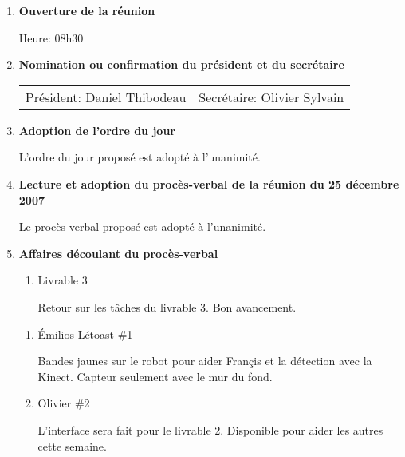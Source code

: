 \documentclass[12pt]{ULojpv}
\begin{document}
\entete
\begin{enumerate}
\item \textbf{Ouverture de la réunion}

Heure: 08h30


\item \textbf{Nomination ou confirmation du président et du secrétaire}

\begin{tabular}{@{}ll}
   Président: Daniel Thibodeau
   & Secrétaire: Olivier Sylvain
\end{tabular}


\item \textbf{Adoption de l'ordre du jour}

L'ordre du jour proposé est adopté à l'unanimité.


\item \textbf{Lecture et adoption du procès-verbal de la réunion du 25 décembre 2007}

Le procès-verbal proposé est adopté à l'unanimité.


\item \textbf{Affaires découlant du procès-verbal}

\begin{enumerate}

\item Livrable 3

Retour sur les tâches du livrable 3. Bon avancement.

\end{enumerate}

\begin{enumerate}

\item Émilios Létoast \#1

Bandes jaunes sur le robot pour aider Françis et la détection avec la Kinect. Capteur seulement avec le mur du fond. 


\item Olivier  \#2

L'interface sera fait pour le livrable 2. Disponible pour aider les autres cette semaine.


\end{enumerate}
\end{enumerate}
\end{document}
